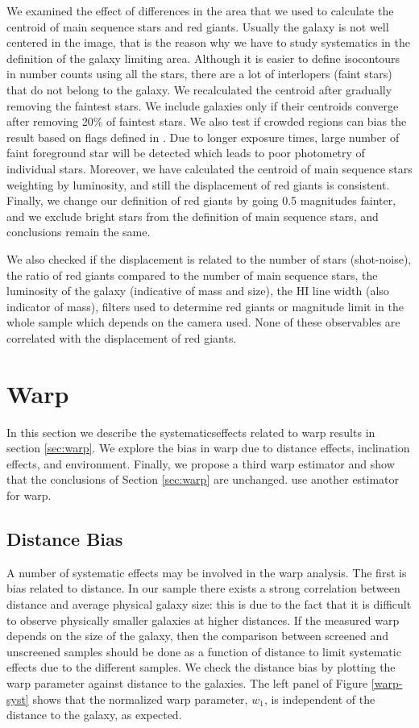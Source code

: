 \documentclass[useAMS,usenatbib,twocolumn]{mn2e}
\begin{document}
We examined the effect of differences in
the area that we used to calculate the centroid of main sequence stars and red
giants. Usually the galaxy is not well centered in the image, that is the
reason why we have to study systematics in the definition of 
the galaxy limiting area. Although it is easier to define isocontours in
number counts using all the stars, there are a lot of interlopers (faint stars)
that do not belong to the galaxy. We recalculated the centroid
after gradually removing the faintest stars. We include galaxies only if their
centroids converge after removing 20\% of faintest stars.
We also test if crowded regions can bias the result based on flags defined in
\citet{dalcanton09}. Due to longer exposure times, large number of faint
foreground star will be detected which leads to poor photometry of individual
stars. Moreover, we have calculated the centroid of main sequence stars
weighting by luminosity, and still the displacement of red giants is consistent.
Finally, we change our definition of red giants by going 0.5
magnitudes fainter, and we exclude bright stars from the definition of
main sequence stars, and conclusions remain the same. 


We also checked if the displacement is related to the number of stars
(shot-noise), the ratio of red giants compared to the number of main sequence
stars,
the luminosity of the galaxy (indicative of mass and size),  the HI line
width (also indicator of mass), filters used to determine red giants or
magnitude limit in the whole sample which depends on the
camera used. None of these observables are correlated with the
displacement of red giants.


\section{Warp}
\label{ap:warp}
In this section we describe the systematicseffects related to warp results in
section \ref{sec:warp}.
We explore the bias in warp due to distance effects, inclination effects,
and environment.  Finally, we propose a third warp estimator
and show that the conclusions of Section \ref{sec:warp} are unchanged.
use another estimator for warp.

\subsection{Distance Bias}
\label{ap:distance-systematic}
A number of systematic effects may be involved in the warp analysis.
The first is bias related to distance.
In our sample there exists a strong correlation between
distance and average physical galaxy size:
this is due to the fact that it is difficult to observe physically
smaller galaxies at higher distances. If the measured warp depends on the
size of the galaxy, then the comparison between screened and unscreened
samples should be done as a function of distance to limit systematic effects
due to the different samples.
We check the distance bias by plotting the warp parameter against
distance to the galaxies. The left panel of Figure \ref{warp-syst} shows that
the normalized warp parameter, $w_1$, is independent of the distance to
the galaxy, as expected.
\end{document}
